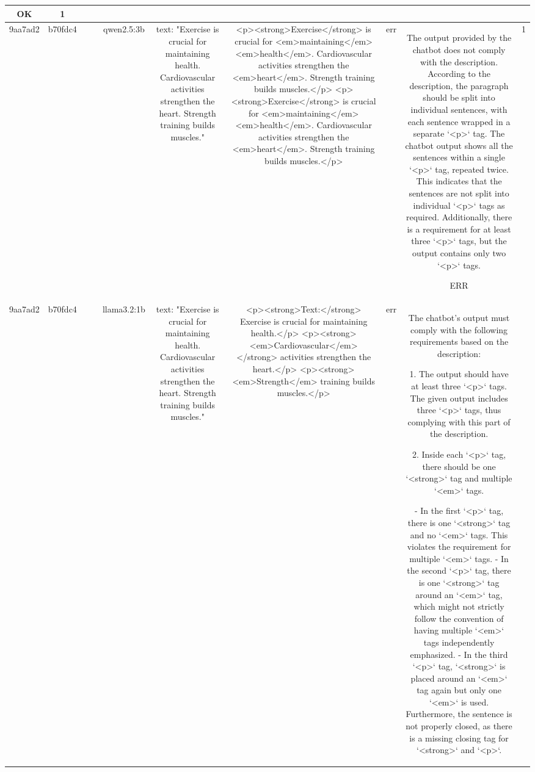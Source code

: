 \begin{table}[h!]
\begin{tabular}{|c|c|c|c|c|c|c|c|c|c|}
OK & 1\\
\hline
9aa7ad2 & b70fdc4 &  &  & qwen2.5:3b & text: "Exercise is crucial for maintaining health. Cardiovascular activities strengthen the heart. Strength training builds muscles." & <p><strong>Exercise</strong> is crucial for <em>maintaining</em> <em>health</em>. Cardiovascular activities strengthen the <em>heart</em>. Strength training builds muscles.</p>
<p><strong>Exercise</strong> is crucial for <em>maintaining</em> <em>health</em>. Cardiovascular activities strengthen the <em>heart</em>. Strength training builds muscles.</p> & err & The output provided by the chatbot does not comply with the description. According to the description, the paragraph should be split into individual sentences, with each sentence wrapped in a separate `<p>` tag. The chatbot output shows all the sentences within a single `<p>` tag, repeated twice. This indicates that the sentences are not split into individual `<p>` tags as required. Additionally, there is a requirement for at least three `<p>` tags, but the output contains only two `<p>` tags. 

ERR & 1\\
\hline
9aa7ad2 & b70fdc4 &  &  & llama3.2:1b & text: "Exercise is crucial for maintaining health. Cardiovascular activities strengthen the heart. Strength training builds muscles." & <p><strong>Text:</strong> Exercise is crucial for maintaining health.</p>
<p><strong> <em>Cardiovascular</em> </strong> activities strengthen the heart.</p>
<p><strong> <em>Strength</em> training builds muscles.</p> & err & The chatbot's output must comply with the following requirements based on the description:

1. The output should have at least three `<p>` tags. The given output includes three `<p>` tags, thus complying with this part of the description.

2. Inside each `<p>` tag, there should be one `<strong>` tag and multiple `<em>` tags. 

- In the first `<p>` tag, there is one `<strong>` tag and no `<em>` tags. This violates the requirement for multiple `<em>` tags.
- In the second `<p>` tag, there is one `<strong>` tag around an `<em>` tag, which might not strictly follow the convention of having multiple `<em>` tags independently emphasized.
- In the third `<p>` tag, `<strong>` is placed around an `<em>` tag again but only one `<em>` is used. Furthermore, the sentence is not properly closed, as there is a missing closing tag for `<strong>` and `<p>`.


\end{tabular}
\end{table}

